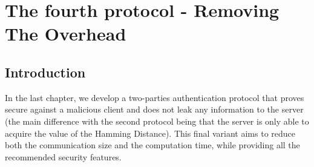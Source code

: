 \chapter{The fourth protocol - Removing The Overhead}
\label{chap:fourthProtocol}

\ifpdf
    \graphicspath{{Chapter7/Figs/Raster/}{Chapter7/Figs/PDF/}{Chapter7/Figs/}}
\else
    \graphicspath{{Chapter7/Figs/Vector/}{Chapter7/Figs/}}
\fi


\section{Introduction}
\label{sec:6intro}
In the last chapter, we develop a two-parties authentication protocol that
proves secure against a malicious client and does not leak any information to the
server (the main difference with the second protocol being that the server is only able to acquire the
value of the Hamming Distance). This final variant aims to reduce both the communication
size and the computation time, while providing all the recommended security
features.
